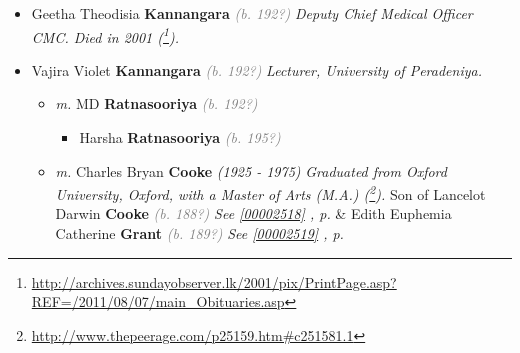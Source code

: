 \documentclass[10pt, openany]{book}
\begin{document}
\begin{itemize}
{\begin{itemize}
{\begin{itemize}
{\begin{itemize}
{\begin{itemize}
{\begin{itemize}
{\begin{itemize}
{\begin{itemize}
{ }
\item{Hasitha II \textbf{Kannangara} \textcolor{gray}{\textit{(b. 199?)}} \textcolor{slmaroon}{\textit{Accounts Receivable Officer (\footnote{\url{https://www.linkedin.com/in/hasitha-kannangara-60b51372/}}).}}
  }
\end{itemize}}
\end{itemize}
 }
\item{Prasanna \textbf{Kannangara} \textcolor{gray}{\textit{(b. 195?)}} \textcolor{slmaroon}{\textit{Banker.}}
\begin{itemize}
\item{\textcolor{slteal}{\textit{See  \autoref{couple:00000359:00000451} \textit{, p. \pageref{couple:00000359:00000451} }}}}
\end{itemize}
 }
\item{Arjuna \textbf{Kannangara} \textcolor{gray}{\textit{(b. 195?)}}
 }
\end{itemize}}
\end{itemize}
  }
\item{Geetha Theodisia \textbf{Kannangara} \textcolor{gray}{\textit{(b. 192?)}} \textcolor{slmaroon}{\textit{Deputy Chief Medical Officer CMC.
Died in 2001 (\footnote{\url{http://archives.sundayobserver.lk/2001/pix/PrintPage.asp?REF=/2011/08/07/main_Obituaries.asp}}).}}
  }
\item{Vajira Violet \textbf{Kannangara} \textcolor{gray}{\textit{(b. 192?)}} \textcolor{slmaroon}{\textit{Lecturer, University of Peradeniya.}}
\begin{itemize}
\item{\textit{m.} MD \textbf{Ratnasooriya} \textcolor{gray}{\textit{(b. 192?)}}   \label{couple:00000459:00000639} \begin{itemize}
\item{Harsha \textbf{Ratnasooriya} \textcolor{gray}{\textit{(b. 195?)}}
 }
\end{itemize}}
\item{\textit{m.} Charles Bryan \textbf{Cooke} \textcolor{slorange}{\textit{(1925 - 1975)}} \textcolor{slmaroon}{\textit{Graduated from Oxford University, Oxford, with a Master of Arts (M.A.) (\footnote{\url{http://www.thepeerage.com/p25159.htm\#c251581.1}}).}} Son of  Lancelot Darwin \textbf{Cooke} \textcolor{gray}{\textit{(b. 188?)}} \textcolor{slteal}{\textit{See  \autoref{00002518} \textit{, p. \pageref{00002518} }}}  \&  Edith Euphemia Catherine \textbf{Grant} \textcolor{gray}{\textit{(b. 189?)}} \textcolor{slteal}{\textit{See  \autoref{00002519} \textit{, p. \pageref{00002519} }}}   \label{couple:00000131:00000459} \begin{itemize}

\end{itemize}}
\end{itemize}}
\end{itemize}}
\end{itemize}}
\end{itemize}}
\end{itemize}
\end{document}
